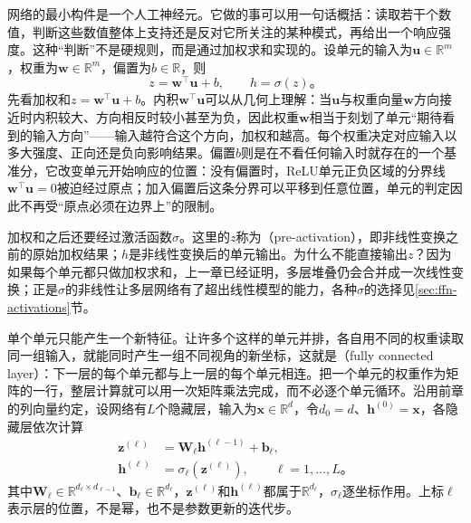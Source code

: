 网络的最小构件是一个人工神经元。它做的事可以用一句话概括：读取若干个数值，判断这些数值整体上支持还是反对它所关注的某种模式，再给出一个响应强度。这种“判断”不是硬规则，而是通过加权求和实现的。设单元的输入为$\bm{u}\in\mathbb{R}^{m}$，权重为$\bm{w}\in\mathbb{R}^{m}$，偏置为$b\in\mathbb{R}$，则
\begin{equation}
  z=\bm{w}^{\top}\bm{u}+b,
  \qquad h=\sigma(z)\text{。}
  \label{eq:ffn-unit}
\end{equation}
先看加权和$z=\bm{w}^{\top}\bm{u}+b$。内积$\bm{w}^{\top}\bm{u}$可以从几何上理解：当$\bm{u}$与权重向量$\bm{w}$方向接近时内积较大、方向相反时较小甚至为负，因此权重$\bm{w}$相当于刻划了单元“期待看到的输入方向”——输入越符合这个方向，加权和越高。每个权重决定对应输入以多大强度、正向还是负向影响结果。偏置$b$则是在不看任何输入时就存在的一个基准分，它改变单元开始响应的位置：没有偏置时，ReLU单元正负区域的分界线$\bm{w}^{\top}\bm{u}=0$被迫经过原点；加入偏置后这条分界可以平移到任意位置，单元的判定因此不再受“原点必须在边界上”的限制。

加权和之后还要经过激活函数$\sigma$。这里的$z$称为（pre-activation），即非线性变换之前的原始加权结果；$h$是非线性变换后的单元输出。为什么不能直接输出$z$？因为如果每个单元都只做加权求和，上一章已经证明，多层堆叠仍会合并成一次线性变换；正是$\sigma$的非线性让多层网络有了超出线性模型的能力，各种$\sigma$的选择见\ref{sec:ffn-activations}节。

单个单元只能产生一个新特征。让许多个这样的单元并排，各自用不同的权重读取同一组输入，就能同时产生一组不同视角的新坐标，这就是（fully connected layer）：下一层的每个单元都与上一层的每个单元相连。把一个单元的权重作为矩阵的一行，整层计算就可以用一次矩阵乘法完成，而不必逐个单元循环。沿用前章的列向量约定，设网络有$L$个隐藏层，输入为$\bm{x}\in\mathbb{R}^{d}$，令$d_0=d$、$\bm{h}^{(0)}=\bm{x}$，各隐藏层依次计算
\begin{equation}
  \begin{aligned}
    \bm{z}^{(\ell)}
      &=\bm{W}_\ell\bm{h}^{(\ell-1)}+\bm{b}_\ell,\\
    \bm{h}^{(\ell)}&=\sigma_\ell\!\left(\bm{z}^{(\ell)}\right),
    \qquad \ell=1,\ldots,L\text{。}
  \end{aligned}
  \label{eq:ffn-hidden-layers}
\end{equation}
其中$\bm{W}_\ell\in\mathbb{R}^{d_\ell\times d_{\ell-1}}$、$\bm{b}_\ell\in\mathbb{R}^{d_\ell}$，$\bm{z}^{(\ell)}$和$\bm{h}^{(\ell)}$都属于$\mathbb{R}^{d_\ell}$，$\sigma_\ell$逐坐标作用。上标$\ell$表示层的位置，不是幂，也不是参数更新的迭代步。

